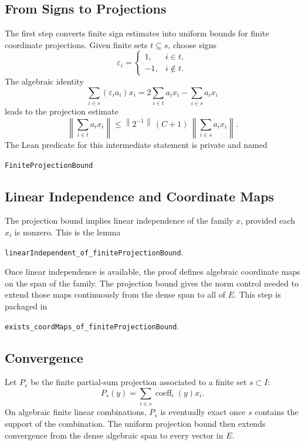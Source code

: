 \documentclass[12pt,a4paper]{article}
\theoremstyle{definition}
\newcommand{\norm}[1]{\left\|#1\right\|}
\begin{document}
\subsection{From Signs to Projections}

The first step converts finite sign estimates into uniform bounds for finite
coordinate projections.  Given finite sets $t\subseteq s$, choose signs
\[
  \varepsilon_i =
  \begin{cases}
    1, & i\in t,\\
    -1, & i\notin t.
  \end{cases}
\]
The algebraic identity
\[
  \sum_{i\in s}(\varepsilon_i a_i)x_i
  =
  2\sum_{i\in t}a_i x_i
  -
  \sum_{i\in s}a_i x_i
\]
leads to the projection estimate
\[
  \norm{\sum_{i\in t}a_i x_i}
  \le
  \norm{2^{-1}}\,(C+1)\,
  \norm{\sum_{i\in s}a_i x_i}.
\]
The Lean predicate for this intermediate statement is private and named
\begin{center}
{\small\verb|FiniteProjectionBound|}
\end{center}

\subsection{Linear Independence and Coordinate Maps}

The projection bound implies linear independence of the family $x$, provided
each $x_i$ is nonzero.  This is the lemma
\begin{center}
\verb|linearIndependent_of_finiteProjectionBound|.
\end{center}

Once linear independence is available, the proof defines algebraic coordinate
maps on the span of the family.  The projection bound gives the norm control
needed to extend those maps continuously from the dense span to all of $E$.
This step is packaged in
\begin{center}
\verb|exists_coordMaps_of_finiteProjectionBound|.
\end{center}

\subsection{Convergence}

Let $P_s$ be the finite partial-sum projection associated to a finite set
$s\subset I$:
\[
  P_s(y)=\sum_{i\in s}\operatorname{coeff}_i(y)x_i.
\]
On algebraic finite linear combinations, $P_s$ is eventually exact once $s$
contains the support of the combination.  The uniform projection bound then
extends convergence from the dense algebraic span to every vector in $E$.
\end{document}
